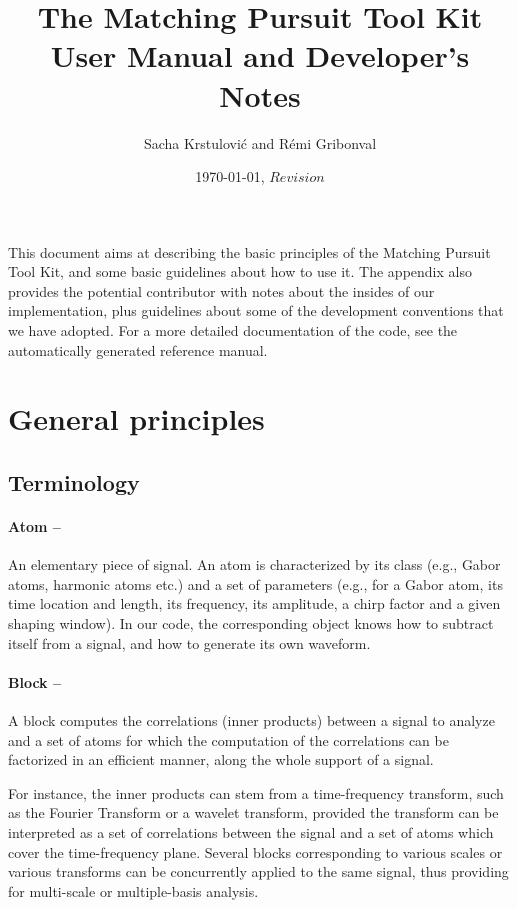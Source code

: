 \documentclass[11pt,a4paper]{article}
\title{The Matching Pursuit Tool Kit \\ User Manual and Developer's Notes}
\author{Sacha Krstulovi\'c and R\'emi Gribonval}
\date{\today, $Revision$}
\begin{document}
\maketitle

\vfill

\tableofcontents

\vfill

\clearpage

\noindent This document aims at describing the basic principles of the Matching
Pursuit Tool Kit, and some basic guidelines about how to use it.  The appendix
also provides the potential contributor with notes about the insides of our
implementation, plus guidelines about some of the development conventions that
we have adopted. For a more detailed documentation of the code, see the
automatically generated reference manual.

\section{General principles \label{gen}}

\subsection{Terminology \label{term}}
\paragraph{Atom --} An elementary piece of signal. An atom is characterized by
its class (e.g., Gabor atoms, harmonic atoms etc.) and a set of parameters
(e.g., for a Gabor atom, its time location and length, its frequency, its
amplitude, a chirp factor and a given shaping window). In our code, the
corresponding object knows how to subtract itself from a signal, and how to
generate its own waveform.

\paragraph{Block --} A block computes the correlations (inner products) between
a signal to analyze and a set of atoms for which the computation of the
correlations can be factorized in an efficient manner, along the whole support
of a signal.

For instance, the inner products can stem from a time-frequency transform, such
as the Fourier Transform or a wavelet transform, provided the transform can be
interpreted as a set of correlations between the signal and a set of atoms
which cover the time-frequency plane.  Several blocks corresponding to various
scales or various transforms can be concurrently applied to the same signal,
thus providing for multi-scale or multiple-basis analysis.
\end{document}
